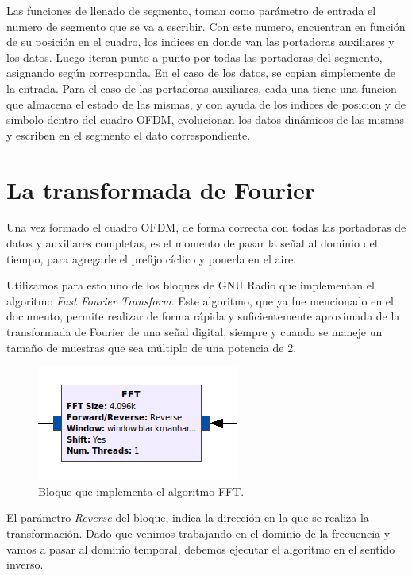 Las funciones de llenado de segmento, toman como parámetro de entrada el numero de segmento que se va a escribir. Con este numero, encuentran en función de su posición en el cuadro, los indices en donde van las portadoras auxiliares y los datos. Luego iteran punto a punto por todas las portadoras del segmento, asignando según corresponda. En el caso de los datos, se copian simplemente de la entrada. Para el caso de las portadoras auxiliares, cada una tiene una funcion que almacena el estado de las mismas, y con ayuda de los indices de posicion y de simbolo dentro del cuadro OFDM, evolucionan los datos dinámicos de las mismas y escriben en el segmento el dato correspondiente. 
	
\section{La transformada de Fourier}

Una vez formado el cuadro OFDM, de forma correcta con todas las portadoras de datos y auxiliares completas, es el momento de pasar la señal al dominio del tiempo, para agregarle el prefijo cíclico y ponerla en el aire. 

Utilizamos para esto uno de los bloques de GNU Radio que implementan el algoritmo \textit{Fast Fourier Transform}. Este algoritmo, que ya fue mencionado en el documento, permite realizar de forma rápida y suficientemente aproximada de la transformada de Fourier de una señal digital, siempre y cuando se maneje un tamaño de muestras que sea múltiplo de una potencia de 2.

\begin{figure}[!h]
	\centering
	\includegraphics[scale=0.5]{figuras/cap05/fft}
	\caption{\label{f:fft} Bloque que implementa el algoritmo FFT.}
\end{figure}

El parámetro \textit{Reverse} del bloque, indica la dirección en la que se realiza la transformación. Dado que venimos trabajando en el dominio de la frecuencia y vamos a pasar al dominio temporal, debemos ejecutar el algoritmo en el sentido inverso.

